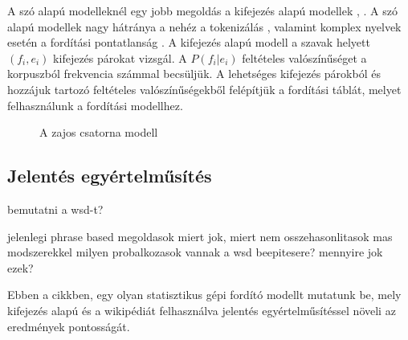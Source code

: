 A szó alapú modelleknél egy jobb megoldás a kifejezés alapú modellek \cite{Marcu:2002}, \cite{Och99improvedalignment}. A szó alapú modellek nagy hátránya a nehéz a tokenizálás \cite{Lopez07asurvey}, valamint komplex nyelvek esetén a fordítási pontatlanság \cite{Lopez07asurvey}. A kifejezés alapú modell a szavak helyett $(f_i, e_i)$ kifejezés párokat vizsgál. A $P(f_i|e_i)$ feltételes valószínűséget a korpuszból frekvencia számmal becsüljük. A lehetséges kifejezés párokból és hozzájuk tartozó feltételes valószínűségekből felépítjük a fordítási táblát, melyet felhasználunk a fordítási modellhez.










\begin{figure}[b]
  	\centering
  	\caption[smt_translation_model]%
  	{A zajos csatorna modell}
 	\label{fig:modell:fig1}
\end{figure}





\subsection{Jelentés egyértelműsítés}
bemutatni a wsd-t?

jelenlegi phrase based megoldasok
	miert jok, miert nem
	osszehasonlitasok mas modszerekkel
milyen probalkozasok vannak a wsd beepitesere?
mennyire jok ezek?


Ebben a cikkben, egy olyan statisztikus gépi fordító modellt mutatunk be, mely kifejezés alapú és a wikipédiát felhasználva jelentés egyértelműsítéssel növeli az eredmények pontosságát.